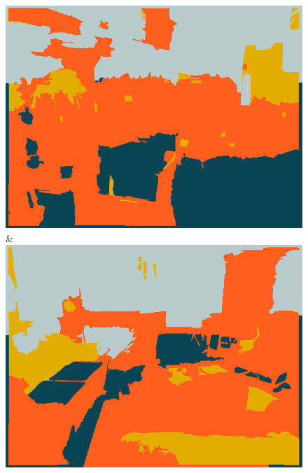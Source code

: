 \begin{figure}
\begin{tabu}
    \includegraphics[width=\linewidth]{nyu/images/00118_ssvm.png}&%
    \includegraphics[width=\linewidth]{nyu/images/01203_ssvm.png}\\
    \vspace{3mm}\\


\end{tabu}
\end{figure}
